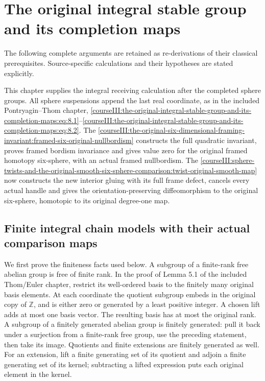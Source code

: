 \section{The original integral stable group and its completion maps}\label{courseIII:the-original-integral-stable-group-and-its-completion-maps:section}

The following complete arguments are retained as re-derivations of their classical prerequisites. Source-specific calculations and their hypotheses are stated explicitly.

This chapter supplies the integral receiving calculation after the completed sphere groups. All sphere suspensions append the last real coordinate, as in the included Pontryagin--Thom chapter, \eqref{courseIII:the-original-integral-stable-group-and-its-completion-maps:eq:8.1}--\eqref{courseIII:the-original-integral-stable-group-and-its-completion-maps:eq:8.2}. The \cref{courseIII:the-original-six-dimensional-framing-invariant:framed-six-original-nullbordism} constructs the full quadratic invariant, proves framed bordism invariance and gives value zero for the original framed homotopy six-sphere, with an actual framed nullbordism. The \cref{courseIII:sphere-twists-and-the-original-smooth-six-sphere-comparison:twist-original-smooth-map} now constructs the new interior gluing with its full frame defect, cancels every actual handle and gives the orientation-preserving diffeomorphism to the original six-sphere, homotopic to its original degree-one map.

\subsection{Finite integral chain models with their actual comparison maps}
\label{courseIII:the-original-integral-stable-group-and-its-completion-maps:integral-finite-chain-models}

\label{courseIII:the-original-integral-stable-group-and-its-completion-maps:section-1}\label{courseIII:integral-stable:1}

We first prove the finiteness facts used below. A subgroup of a finite-rank free abelian group is free of finite rank. In the proof of Lemma 5.1 of the included Thom/Euler chapter, restrict its well-ordered basis to the finitely many original basis elements. At each coordinate the quotient subgroup embeds in the original copy of \(\mathbb Z\), and is either zero or generated by a least positive integer. A chosen lift adds at most one basis vector. The resulting basis has at most the original rank. A subgroup of a finitely generated abelian group is finitely generated: pull it back under a surjection from a finite-rank free group, use the preceding statement, then take its image. Quotients and finite extensions are finitely generated as well. For an extension, lift a finite generating set of its quotient and adjoin a finite generating set of its kernel; subtracting a lifted expression puts each original element in the kernel.

